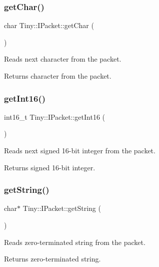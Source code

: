 \subsubsection{\texorpdfstring{get\+Char()}{getChar()}}
{\footnotesize\ttfamily char Tiny\+::\+I\+Packet\+::get\+Char (\begin{DoxyParamCaption}{ }\end{DoxyParamCaption})\hspace{0.3cm}{\ttfamily [inline]}}

Reads next character from the packet. \begin{DoxyReturn}{Returns}
character from the packet. 
\end{DoxyReturn}
\mbox{\label{classTiny_1_1IPacket_a9fd3b560b1f34e5d4c3e4a856bddc293}} 
\subsubsection{\texorpdfstring{get\+Int16()}{getInt16()}}
{\footnotesize\ttfamily int16\+\_\+t Tiny\+::\+I\+Packet\+::get\+Int16 (\begin{DoxyParamCaption}{ }\end{DoxyParamCaption})\hspace{0.3cm}{\ttfamily [inline]}}

Reads next signed 16-\/bit integer from the packet. \begin{DoxyReturn}{Returns}
signed 16-\/bit integer. 
\end{DoxyReturn}
\mbox{\label{classTiny_1_1IPacket_ac6e6a22ce9a652954491a8d4db081d79}} 
\subsubsection{\texorpdfstring{get\+String()}{getString()}}
{\footnotesize\ttfamily char$\ast$ Tiny\+::\+I\+Packet\+::get\+String (\begin{DoxyParamCaption}{ }\end{DoxyParamCaption})\hspace{0.3cm}{\ttfamily [inline]}}

Reads zero-\/terminated string from the packet. \begin{DoxyReturn}{Returns}
zero-\/terminated string. 
\end{DoxyReturn}
\mbox{\label{classTiny_1_1IPacket_a345d5d5791d5929c9a5f9bb2763f99a5}} 
